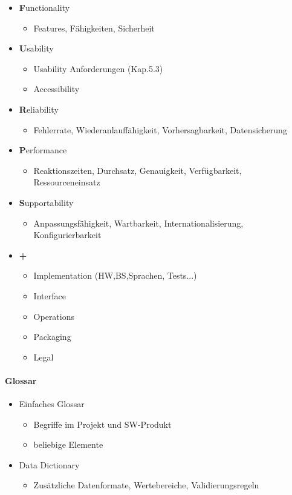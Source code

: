 \documentclass{article}
\begin{document}
\begin{itemize}
	\item \textbf Functionality
	\begin{itemize}
		\item Features, Fähigkeiten, Sicherheit
	\end{itemize}
	\item \textbf Usability
	\begin{itemize}
		\item Usability Anforderungen (Kap.5.3)
		\item Accessibility
	\end{itemize}
	\item \textbf Reliability
	\begin{itemize}
		\item Fehlerrate, Wiederanlauffähigkeit, Vorhersagbarkeit, Datensicherung
	\end{itemize}
	\item \textbf Performance
	\begin{itemize}
		\item Reaktionszeiten, Durchsatz, Genauigkeit, Verfügbarkeit, Ressourceneinsatz
	\end{itemize}
	\item \textbf Supportability
	\begin{itemize}
		\item Anpassungsfähigkeit, Wartbarkeit, Internationalisierung, Konfigurierbarkeit
	\end{itemize}
	\item \textbf {+}
	\begin{itemize}
		\item Implementation (HW,BS,Sprachen, Tests...)
		\item Interface
		\item Operations
		\item Packaging
		\item Legal
	\end{itemize}
\end{itemize}


\paragraph{Glossar}

\begin{itemize}
	\item Einfaches Glossar
	\begin{itemize}
		\item Begriffe im Projekt und SW-Produkt
		\item beliebige Elemente 
	\end{itemize}
	\item Data Dictionary
	\begin{itemize}
		\item Zusätzliche Datenformate, Wertebereiche, Validierungsregeln
	\end{itemize}
\end{itemize}
\end{document}
